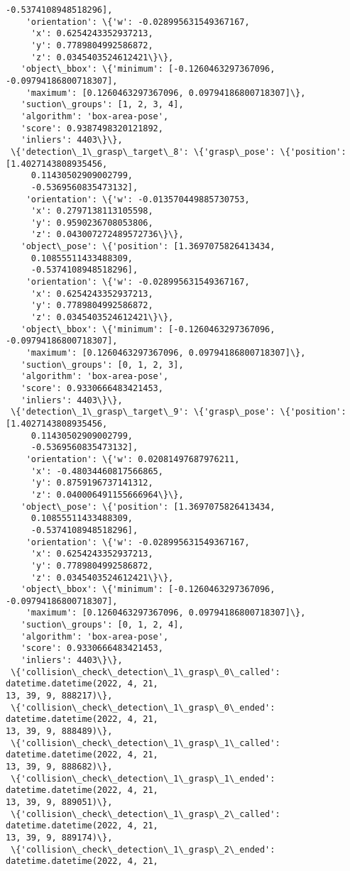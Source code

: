 \documentclass[11pt]{article}
\begin{document}
\begin{tcolorbox}[breakable, size=fbox, boxrule=.5pt, pad at break*=1mm, opacityfill=0]
\begin{Verbatim}[commandchars=\\\{\}]
     -0.5374108948518296],
    'orientation': \{'w': -0.028995631549367167,
     'x': 0.6254243352937213,
     'y': 0.7789804992586872,
     'z': 0.0345403524612421\}\},
   'object\_bbox': \{'minimum': [-0.1260463297367096, -0.09794186800718307],
    'maximum': [0.1260463297367096, 0.09794186800718307]\},
   'suction\_groups': [1, 2, 3, 4],
   'algorithm': 'box-area-pose',
   'score': 0.9387498320121892,
   'inliers': 4403\}\},
 \{'detection\_1\_grasp\_target\_8': \{'grasp\_pose': \{'position': [1.4027143808935456,
     0.11430502909002799,
     -0.5369560835473132],
    'orientation': \{'w': -0.013570449885730753,
     'x': 0.2797138113105598,
     'y': 0.9590236708053806,
     'z': 0.043007272489572736\}\},
   'object\_pose': \{'position': [1.3697075826413434,
     0.10855511433488309,
     -0.5374108948518296],
    'orientation': \{'w': -0.028995631549367167,
     'x': 0.6254243352937213,
     'y': 0.7789804992586872,
     'z': 0.0345403524612421\}\},
   'object\_bbox': \{'minimum': [-0.1260463297367096, -0.09794186800718307],
    'maximum': [0.1260463297367096, 0.09794186800718307]\},
   'suction\_groups': [0, 1, 2, 3],
   'algorithm': 'box-area-pose',
   'score': 0.9330666483421453,
   'inliers': 4403\}\},
 \{'detection\_1\_grasp\_target\_9': \{'grasp\_pose': \{'position': [1.4027143808935456,
     0.11430502909002799,
     -0.5369560835473132],
    'orientation': \{'w': 0.02081497687976211,
     'x': -0.48034460817566865,
     'y': 0.8759196737141312,
     'z': 0.040006491155666964\}\},
   'object\_pose': \{'position': [1.3697075826413434,
     0.10855511433488309,
     -0.5374108948518296],
    'orientation': \{'w': -0.028995631549367167,
     'x': 0.6254243352937213,
     'y': 0.7789804992586872,
     'z': 0.0345403524612421\}\},
   'object\_bbox': \{'minimum': [-0.1260463297367096, -0.09794186800718307],
    'maximum': [0.1260463297367096, 0.09794186800718307]\},
   'suction\_groups': [0, 1, 2, 4],
   'algorithm': 'box-area-pose',
   'score': 0.9330666483421453,
   'inliers': 4403\}\},
 \{'collision\_check\_detection\_1\_grasp\_0\_called': datetime.datetime(2022, 4, 21,
13, 39, 9, 888217)\},
 \{'collision\_check\_detection\_1\_grasp\_0\_ended': datetime.datetime(2022, 4, 21,
13, 39, 9, 888489)\},
 \{'collision\_check\_detection\_1\_grasp\_1\_called': datetime.datetime(2022, 4, 21,
13, 39, 9, 888682)\},
 \{'collision\_check\_detection\_1\_grasp\_1\_ended': datetime.datetime(2022, 4, 21,
13, 39, 9, 889051)\},
 \{'collision\_check\_detection\_1\_grasp\_2\_called': datetime.datetime(2022, 4, 21,
13, 39, 9, 889174)\},
 \{'collision\_check\_detection\_1\_grasp\_2\_ended': datetime.datetime(2022, 4, 21,

\end{Verbatim}
\end{tcolorbox}
\end{document}
